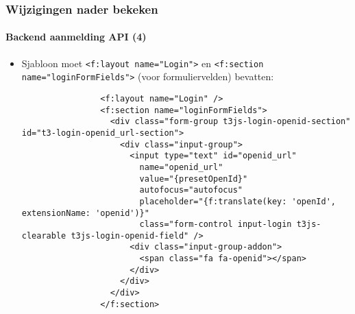 \begin{frame}[fragile]
	\frametitle{Wijzigingen nader bekeken}
	\framesubtitle{Backend aanmelding API (4)}

	\lstset{basicstyle=\tiny\ttfamily}

	\begin{itemize}

		\item Sjabloon moet \texttt{<f:layout name="Login">} en
			\texttt{<f:section name="loginFormFields">} (voor formuliervelden) bevatten:

			\begin{lstlisting}
				<f:layout name="Login" />
				<f:section name="loginFormFields">
				  <div class="form-group t3js-login-openid-section" id="t3-login-openid_url-section">
				    <div class="input-group">
				      <input type="text" id="openid_url"
				        name="openid_url"
				        value="{presetOpenId}"
				        autofocus="autofocus"
				        placeholder="{f:translate(key: 'openId', extensionName: 'openid')}"
				        class="form-control input-login t3js-clearable t3js-login-openid-field" />
				      <div class="input-group-addon">
				        <span class="fa fa-openid"></span>
				      </div>
				    </div>
				  </div>
				</f:section>
			\end{lstlisting}

	\end{itemize}

\end{frame}


